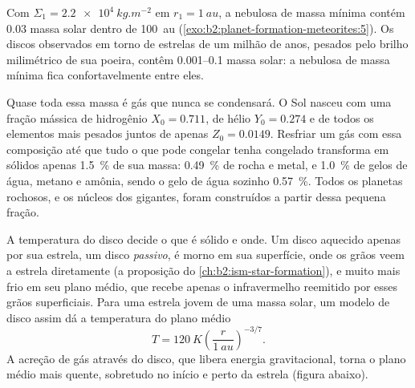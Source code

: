 Com $\Sigma_1 = \qty{2.2e4}{kg.m^{-2}}$ em $r_1 = \qty{1}{au}$, a nebulosa de massa
mínima contém $0.03$ massa solar dentro de \qty{100}{au} (\cref{exo:b2:planet-formation-meteorites:5}). Os discos
observados em torno de estrelas de um milhão de anos, pesados pelo brilho milimétrico de
sua poeira, contêm \numrange{0.001}{0.1} massa solar: a nebulosa de massa mínima
fica confortavelmente entre eles.

Quase toda essa massa é gás que nunca se condensará. O Sol nasceu
com uma fração mássica de hidrogênio $X_0 = 0.711$, de hélio $Y_0 = 0.274$ e de
todos os elementos mais pesados juntos de apenas $Z_0 = 0.0149$. Resfriar um gás com essa
composição até que tudo o que pode congelar tenha congelado transforma em sólidos apenas
\qty{1.5}{\percent} de sua massa: \qty{0.49}{\percent} de rocha e
metal, e \qty{1.0}{\percent} de gelos de água, metano e amônia, sendo o gelo de água
sozinho \qty{0.57}{\percent}. Todos os planetas rochosos, e os núcleos dos
gigantes, foram construídos a partir dessa pequena fração.

A temperatura do disco decide o que é sólido e onde. Um disco aquecido apenas por
sua estrela, um disco \emph{passivo}, é morno em sua superfície, onde os grãos veem
a estrela diretamente (a proposição do \cref{ch:b2:ism-star-formation}), e
muito mais frio em seu plano médio, que recebe apenas o infravermelho reemitido por
esses grãos superficiais. Para uma estrela jovem de uma massa solar, um modelo de disco assim
dá a temperatura do plano médio
\[
  T = \qty{120}{K}\left(\frac{r}{\qty{1}{au}}\right)^{-3/7}.
\]
A acreção de gás através do disco, que libera energia gravitacional, torna
o plano médio mais quente, sobretudo no início e perto da estrela (figura abaixo).

